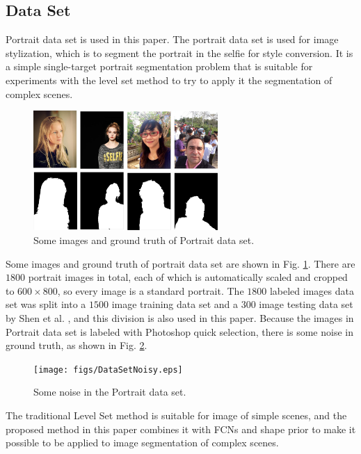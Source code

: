 \subsection{Data Set}
Portrait data set is used in this paper. The portrait data set is used for image stylization, which is to segment the portrait in the selfie for style conversion. It is a simple single-target portrait segmentation problem that is suitable for experiments with the level set method to try to apply it the segmentation of complex scenes.
\begin{figure}[h]
    \centering
    \includegraphics[width = 7cm]{figs/PortraitDataSet.jpg}
    \caption{Some images and ground truth of Portrait data set.}\label{fig: Some images and ground truth of Portrait data set}
\end{figure}
Some images and ground truth of portrait data set are shown in Fig. \ref{fig: Some images and ground truth of Portrait data set}. There are $1800$ portrait images in total, each of which is automatically scaled and cropped to $600\times800$, so every image is a standard portrait. The $1800$ labeled images data set was split into a $1500$ image training data set and a $300$ image testing data set by Shen et al. \cite{FCN:segmentation:shen2016automatic}, and this division is also used in this paper. Because the images in Portrait data set is labeled with Photoshop quick selection, there is some noise in ground truth, as shown in Fig. \ref{fig: Some noise in the Portrait data set}.
\begin{figure}[h]
    \centering
    \texttt{[image: figs/DataSetNoisy.eps]}
    \caption{Some noise in the Portrait data set.}\label{fig: Some noise in the Portrait data set}
\end{figure}

The traditional Level Set method is suitable for image of simple scenes, and the proposed method in this paper combines it with FCNs and shape prior to make it possible to be applied to image segmentation of complex scenes.

